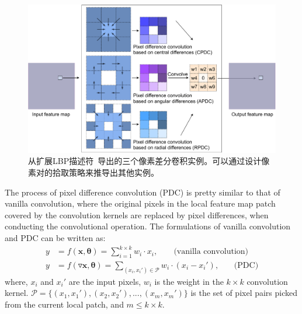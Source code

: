 \documentclass[10pt,twocolumn,letterpaper]{article}
\begin{document}
\begin{figure}[t!]
    \centering
    \includegraphics[width=1\linewidth]{images/pdc.pdf}
    \caption{从扩展LBP描述符~\cite{liu2011sorted, liu2012extended, su2019bird}导出的三个像素差分卷积实例。可以通过设计像素对的拾取策略来推导出其他实例。}
    \label{fig:pdc}
\end{figure}

The process of pixel difference convolution (PDC) is pretty similar to that of vanilla convolution, where the original pixels in the local feature map patch covered by the convolution kernels are replaced by pixel differences, when conducting the convolutional operation. The formulations of vanilla convolution and PDC can be written as:
\begin{align}
    y &= f(\pmb{x}, \pmb{\theta}) = \sum_{i=1}^{k\times k}w_{i}\cdot x_{i}, \;\;\;\;\;\;\; \text{(vanilla convolution)} \\
    y &= f(\triangledown\pmb{x}, \pmb{\theta}) = \sum_{(x_i, x_i')\in \pmb{\mathcal{P}}}w_{i}\cdot (x_i - x_i'), \;\;\;\;\;\;\, \text{(PDC)} \label{eq: pdc}
\end{align}
where, $x_i$ and $x_i'$ are the input pixels, $w_i$ is the weight in the $k \times k$ convolution kernel. $\pmb{\mathcal{P}} = \{(x_1, x_1'), (x_2, x_2'), ..., (x_m, x_m')\}$ is the set of pixel pairs picked from the current local patch, and $m\le k\times k$. 
\end{document}
